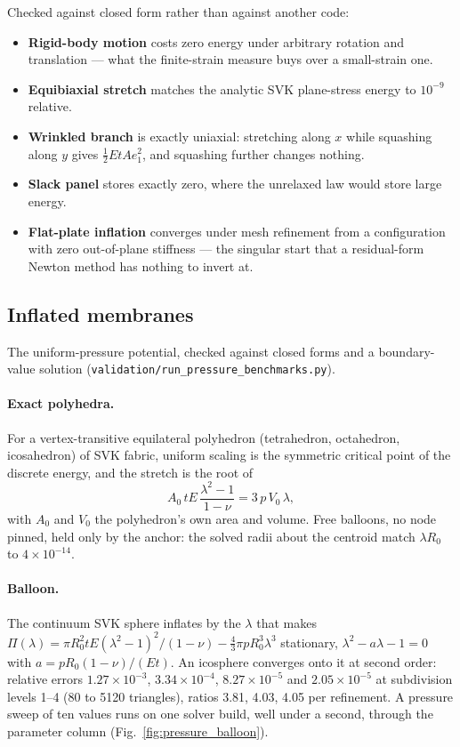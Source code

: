 \documentclass[11pt,a4paper]{article}
\newcommand{\code}[1]{\texttt{\small #1}}
\begin{document}
Checked against closed form rather than against another code:

\begin{itemize}
\item \textbf{Rigid-body motion} costs zero energy under arbitrary rotation and
translation --- what the finite-strain measure buys over a small-strain one.
\item \textbf{Equibiaxial stretch} matches the analytic SVK plane-stress energy
to $10^{-9}$ relative.
\item \textbf{Wrinkled branch} is exactly uniaxial: stretching along $x$ while
squashing along $y$ gives $\tfrac{1}{2}E t A e_1^2$, and squashing further
changes nothing.
\item \textbf{Slack panel} stores exactly zero, where the unrelaxed law would
store large energy.
\item \textbf{Flat-plate inflation} converges under mesh refinement from a
configuration with zero out-of-plane stiffness --- the singular start that a
residual-form Newton method has nothing to invert at.
\end{itemize}

\subsection{Inflated membranes}

The uniform-pressure potential, checked against closed forms and a
boundary-value solution (\code{validation/run\_pressure\_benchmarks.py}).

\paragraph{Exact polyhedra.} For a vertex-transitive equilateral polyhedron
(tetrahedron, octahedron, icosahedron) of SVK fabric, uniform scaling is the
symmetric critical point of the discrete energy, and the stretch is the root of
\begin{equation}
  A_0\,tE\,\frac{\lambda^2-1}{1-\nu} = 3\,p\,V_0\,\lambda,
\end{equation}
with $A_0$ and $V_0$ the polyhedron's own area and volume. Free balloons, no
node pinned, held only by the anchor: the solved radii about the centroid match
$\lambda R_0$ to $4\times10^{-14}$.

\paragraph{Balloon.} The continuum SVK sphere inflates by the $\lambda$ that
makes
$\Pi(\lambda) = \pi R_0^2 tE(\lambda^2-1)^2/(1-\nu) - \tfrac{4}{3}\pi pR_0^3\lambda^3$
stationary, $\lambda^2 - a\lambda - 1 = 0$ with $a = pR_0(1-\nu)/(Et)$. An
icosphere converges onto it at second order: relative errors
$1.27\times10^{-3}$, $3.34\times10^{-4}$, $8.27\times10^{-5}$ and
$2.05\times10^{-5}$ at subdivision levels 1--4 (80 to 5120 triangles), ratios
3.81, 4.03, 4.05 per refinement. A pressure sweep of ten values runs on one
solver build, well under a second, through the parameter column
(Fig.~\ref{fig:pressure_balloon}).
\end{document}

